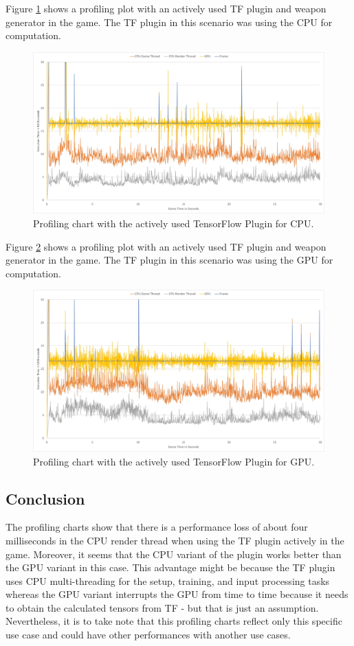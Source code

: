 \documentclass[MGS,Master,english]{twbook}%
\begin{document}
Figure \ref{scenario::profiling_CPU} shows a profiling plot with an actively used TF plugin and weapon generator in the game. The TF plugin in this scenario was using the CPU for computation. 
\begin{figure}[!ht]
	\centering
	\includegraphics[width=1.0\linewidth]{PICs/Profiling/tf_cpu}
	\caption{Profiling chart with the actively used TensorFlow Plugin for CPU.} \label{scenario::profiling_CPU}
\end{figure}

Figure \ref{scenario::profiling_GPU} shows a profiling plot with an actively used TF plugin and weapon generator in the game. The TF plugin in this scenario was using the GPU for computation.
\begin{figure}[!ht]
	\centering
	\includegraphics[width=1.0\linewidth]{PICs/Profiling/tf_gpu}
	\caption{Profiling chart with the actively used TensorFlow Plugin for GPU.} \label{scenario::profiling_GPU}
\end{figure}

\subsection{Conclusion}
The profiling charts show that there is a performance loss of about four milliseconds in the CPU render thread when using the TF plugin actively in the game. Moreover, it seems that the CPU variant of the plugin works better than the GPU variant in this case. This advantage might be because the TF plugin uses CPU multi-threading for the setup, training, and input processing tasks whereas the GPU variant interrupts the GPU from time to time because it needs to obtain the calculated tensors from TF - but that is just an assumption. Nevertheless, it is to take note that this profiling charts reflect only this specific use case and could have other performances with another use cases. 
\end{document}
